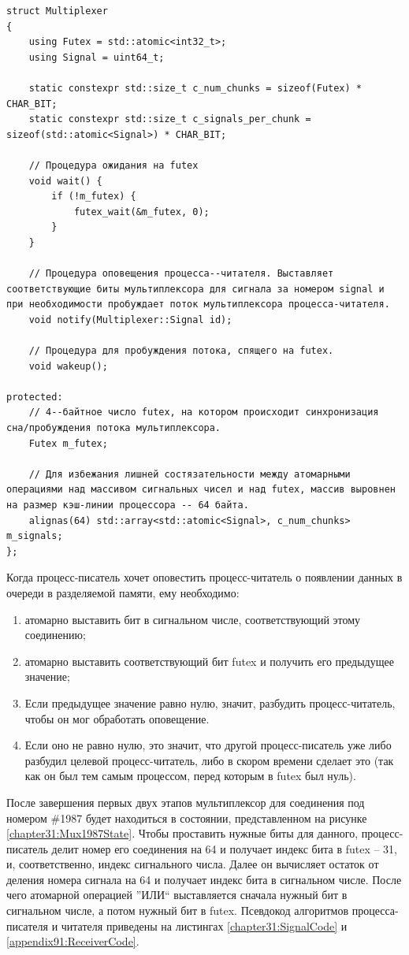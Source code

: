 \begin{lstlisting}[float=!h,caption={Структура мультиплексора в памяти},label={chapter31:MultiplexerStruct},frame=tlrb]
struct Multiplexer
{
    using Futex = std::atomic<int32_t>;
    using Signal = uint64_t;

    static constexpr std::size_t c_num_chunks = sizeof(Futex) * CHAR_BIT;
    static constexpr std::size_t c_signals_per_chunk = sizeof(std::atomic<Signal>) * CHAR_BIT;
	
	// Процедура ожидания на futex
    void wait() {
    	if (!m_futex) {
   			futex_wait(&m_futex, 0);
   		}
    }
	
	// Процедура оповещения процесса--читателя. Выставляет соответствующие биты мультиплексора для сигнала за номером signal и при необходимости пробуждает поток мультиплексора процесса-читателя.
    void notify(Multiplexer::Signal id);
    
    // Процедура для пробуждения потока, спящего на futex.
    void wakeup();

protected:
	// 4--байтное число futex, на котором происходит синхронизация сна/пробуждения потока мультиплексора.
    Futex m_futex;
	
	// Для избежания лишней состязательности между атомарными операциями над массивом сигнальных чисел и над futex, массив выровнен на размер кэш-линии процессора -- 64 байта.
    alignas(64) std::array<std::atomic<Signal>, c_num_chunks> m_signals;
};
\end{lstlisting}

Когда процесс-писатель хочет оповестить процесс-читатель о появлении данных в очереди в разделяемой памяти, ему необходимо:
\begin{enumerate}
\item атомарно выставить бит в сигнальном числе, соответствующий этому соединению;
\item атомарно выставить соответствующий бит futex и получить его предыдущее значение;
\item Если предыдущее значение равно нулю, значит, разбудить процесс-читатель, чтобы он мог обработать оповещение.
\item Если оно не равно нулю, это значит, что другой процесс-писатель уже либо разбудил целевой процесс-читатель, либо в скором времени сделает это (так как он был тем самым процессом, перед которым в futex был нуль).
\end{enumerate}

После завершения первых двух этапов мультиплексор для соединения под номером \#1987 будет находиться в состоянии, представленном на рисунке \ref{chapter31:Mux1987State}. Чтобы проставить нужные биты для данного, процесс-писатель делит номер его соединения на 64 и получает индекс бита в futex -- 31, и, соответственно, индекс сигнального числа. Далее он вычисляет остаток от деления номера сигнала на 64 и получает индекс бита в сигнальном числе. После чего атомарной операцией ''ИЛИ`` выставляется сначала нужный бит в сигнальном числе, а потом нужный бит в futex. Псевдокод алгоритмов процесса-писателя и читателя приведены на листингах \ref{chapter31:SignalCode} и \ref{appendix91:ReceiverCode}.

